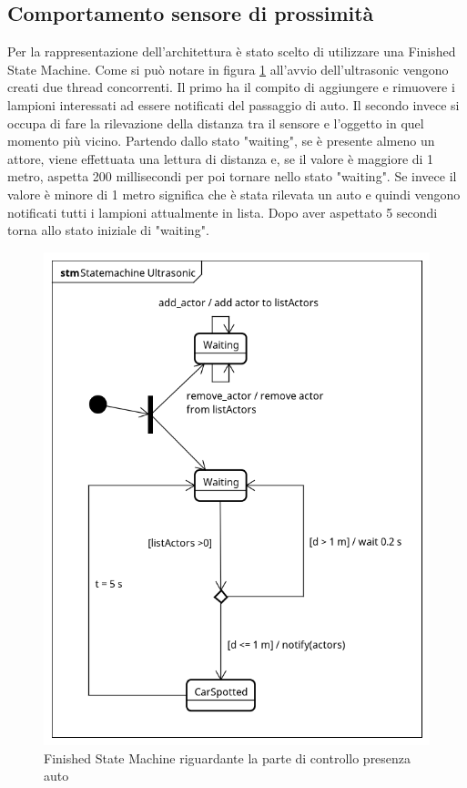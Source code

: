 \subsection{Comportamento sensore di prossimità}
Per la rappresentazione dell'architettura è stato scelto di utilizzare una Finished State Machine.
Come si può notare in figura \ref{FSM CAR} all'avvio dell'ultrasonic vengono creati due thread concorrenti. Il primo ha il compito di aggiungere e rimuovere i lampioni interessati ad essere notificati del passaggio di auto.
Il secondo invece si occupa di fare la rilevazione della distanza tra il sensore e l'oggetto in quel momento più vicino. Partendo dallo stato "waiting", se è presente almeno un attore, viene effettuata una lettura di distanza e, se il valore è maggiore di 1 metro, aspetta 200 millisecondi per poi tornare nello stato "waiting". Se invece il valore è minore di 1 metro significa che è stata rilevata un auto e quindi vengono notificati tutti i lampioni attualmente in lista. Dopo aver aspettato 5 secondi torna allo stato iniziale di "waiting".


\begin{figure}[tbp]
	\centering
	\includegraphics[scale=.75]{figure/Statemachine_Ultrasonic.png}
	\caption{Finished State Machine riguardante la parte di controllo presenza auto \label{FSM CAR}}
\end{figure}


